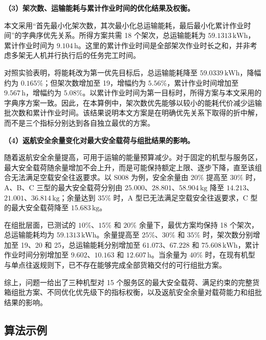 \documentclass[bwprint,fontset=fandol]{gmcmthesis}
\begin{document}
\noindent\textbf{（3）架次数、运输能耗与累计作业时间的优化结果及权衡。}

本文采用“首先最小化架次数，其次最小化总运输能耗，最后最小化累计作业时间”的字典序优先关系。所得方案共需 18 个架次，总运输能耗为 $59.1313\,\mathrm{kWh}$，累计作业时间为 $9.104\,\mathrm{h}$。这里的累计作业时间是全部架次作业时长之和，并非考虑多架无人机并行执行后的任务完工时间。

对照实验表明，将能耗改为第一优先目标后，总运输能耗降至 $59.0339\,\mathrm{kWh}$，降幅约为 $0.165\%$；但架次数增加至 19，增幅约为 $5.56\%$，累计作业时间增加至 $9.567\,\mathrm{h}$，增幅约为 $5.08\%$。以累计作业时间为第一目标时，所得方案与本文采用的字典序方案一致。因此，在本算例中，架次数优先能够以较小的能耗代价减少运输批次数和累计作业时间。该结果说明本文方案是在明确优先关系下取得的折中解，而不是三个指标分别达到各自独立最优的方案。

\noindent\textbf{（4）返航安全余量变化对最大安全载荷与组批结果的影响。}

随着返航安全余量提高，可用于运输的能量预算减少。对于固定的机型与服务区，最大安全载荷随余量增加不会上升，而是可能保持额定上限、逐步下降，直至该组合无法满足空载安全往返要求。以 S008 为例，安全余量由 $20\%$ 提高至 $30\%$ 时，A、B、C 三型的最大安全载荷分别由 $25.000$、$28.801$、$58.904\,\mathrm{kg}$ 降至 $14.213$、$21.001$、$36.814\,\mathrm{kg}$；余量达到 $35\%$ 时，A 型已无法满足空载安全往返要求，C 型的最大安全载荷降至 $15.683\,\mathrm{kg}$。

在组批层面，已测试的 $10\%$、$15\%$ 和 $20\%$ 余量下，最优方案均保持 18 个架次，总运输能耗均为 $59.1313\,\mathrm{kWh}$。余量提高至 $25\%$、$30\%$ 和 $35\%$ 时，架次数分别增加至 19、20 和 25，总运输能耗分别增加至 $61.073$、$67.228$ 和 $75.608\,\mathrm{kWh}$，累计作业时间分别增加至 $9.602$、$10.163$ 和 $12.607\,\mathrm{h}$。当余量为 $40\%$ 时，在现有机型与单点往返规则下，已不存在能够完成全部货箱交付的可行组批方案。

综上，问题一给出了三种机型对 15 个服务区的最大安全载荷、满足约束的完整货箱组批方案、不同优化优先级下的指标权衡，以及返航安全余量对载荷能力和组批结果的影响。
\FloatBarrier

\subsection{算法示例}
\end{document}
